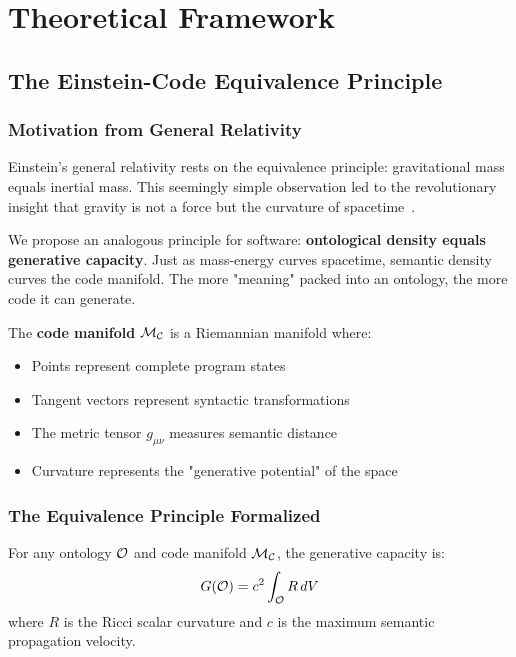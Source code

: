 \chapter{Theoretical Framework}
\label{ch:theory}

\section{The Einstein-Code Equivalence Principle}

\subsection{Motivation from General Relativity}

Einstein's general relativity rests on the equivalence principle: gravitational mass equals inertial mass. This seemingly simple observation led to the revolutionary insight that gravity is not a force but the curvature of spacetime~\cite{einstein1916foundation}.

We propose an analogous principle for software: \textbf{ontological density equals generative capacity}. Just as mass-energy curves spacetime, semantic density curves the code manifold. The more "meaning" packed into an ontology, the more code it can generate.

\begin{definition}
The \textbf{code manifold} $\mathcal{M}_{\mathcal{C}}$ is a Riemannian manifold where:
\begin{itemize}
    \item Points represent complete program states
    \item Tangent vectors represent syntactic transformations
    \item The metric tensor $g_{\mu\nu}$ measures semantic distance
    \item Curvature represents the "generative potential" of the space
\end{itemize}
\end{definition}

\subsection{The Equivalence Principle Formalized}

\begin{axiom}
For any ontology $\mathcal{O}$ and code manifold $\mathcal{M}_{\mathcal{C}}$, the generative capacity is:
\begin{equation}
G(\mathcal{O}) = c^2 \int_{\mathcal{O}} R \, dV
\end{equation}
where $R$ is the Ricci scalar curvature and $c$ is the maximum semantic propagation velocity.
\end{axiom}

